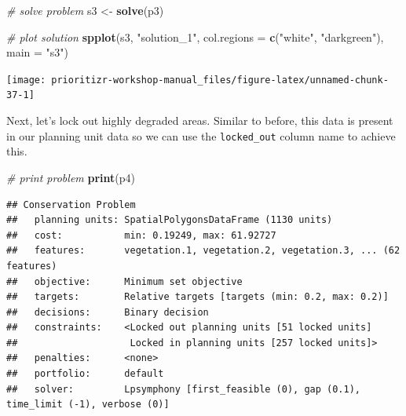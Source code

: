 \documentclass[12pt,]{book}
\newenvironment{Shaded}{\begin{snugshade}}{\end{snugshade}}
\newcommand{\KeywordTok}[1]{\textcolor[rgb]{0.13,0.29,0.53}{\textbf{#1}}}
\newcommand{\DataTypeTok}[1]{\textcolor[rgb]{0.13,0.29,0.53}{#1}}
\newcommand{\FloatTok}[1]{\textcolor[rgb]{0.00,0.00,0.81}{#1}}
\newcommand{\StringTok}[1]{\textcolor[rgb]{0.31,0.60,0.02}{#1}}
\newcommand{\CommentTok}[1]{\textcolor[rgb]{0.56,0.35,0.01}{\textit{#1}}}
\newcommand{\OtherTok}[1]{\textcolor[rgb]{0.56,0.35,0.01}{#1}}
\newcommand{\OperatorTok}[1]{\textcolor[rgb]{0.81,0.36,0.00}{\textbf{#1}}}
\newcommand{\NormalTok}[1]{#1}
\begin{document}
\begin{Shaded}
\begin{Highlighting}[]
\CommentTok{# solve problem}
\NormalTok{s3 <-}\StringTok{ }\KeywordTok{solve}\NormalTok{(p3)}

\CommentTok{# plot solution}
\KeywordTok{spplot}\NormalTok{(s3, }\StringTok{"solution_1"}\NormalTok{, }\DataTypeTok{col.regions =} \KeywordTok{c}\NormalTok{(}\StringTok{"white"}\NormalTok{, }\StringTok{"darkgreen"}\NormalTok{), }\DataTypeTok{main =} \StringTok{"s3"}\NormalTok{)}
\end{Highlighting}
\end{Shaded}

\begin{center}\texttt{[image: prioritizr-workshop-manual\_files/figure-latex/unnamed-chunk-37-1]} \end{center}

Next, let's lock out highly degraded areas. Similar to before, this data
is present in our planning unit data so we can use the
\texttt{locked\_out} column name to achieve this.

\begin{Shaded}
\end{Shaded}

\begin{Shaded}
\begin{Highlighting}[]
\CommentTok{# print problem}
\KeywordTok{print}\NormalTok{(p4)}
\end{Highlighting}
\end{Shaded}

\begin{verbatim}
## Conservation Problem
##   planning units: SpatialPolygonsDataFrame (1130 units)
##   cost:           min: 0.19249, max: 61.92727
##   features:       vegetation.1, vegetation.2, vegetation.3, ... (62 features)
##   objective:      Minimum set objective 
##   targets:        Relative targets [targets (min: 0.2, max: 0.2)]
##   decisions:      Binary decision 
##   constraints:    <Locked out planning units [51 locked units]
##                    Locked in planning units [257 locked units]>
##   penalties:      <none>
##   portfolio:      default
##   solver:         Lpsymphony [first_feasible (0), gap (0.1), time_limit (-1), verbose (0)]
\end{verbatim}
\end{document}
